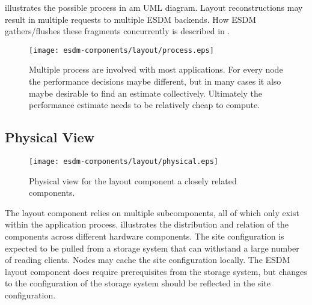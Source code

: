  illustrates the possible process in am UML diagram.
Layout reconstructions may result in multiple requests to multiple ESDM backends.
How ESDM gathers/flushes these fragments concurrently is described in .


\begin{figure}
	\centering
	\texttt{[image: esdm-components/layout/process.eps]}
	\caption{Multiple process are involved with most applications. For every node the performance decisions maybe different, but in many cases it also maybe desirable to find an estimate collectively. Ultimately the performance estimate needs to be relatively cheap to compute. }
	\label{fig:esdm layout process view}
\end{figure}





\subsection{Physical View}

\begin{figure}
	\centering
	\texttt{[image: esdm-components/layout/physical.eps]}
	\caption{Physical view for the layout component a closely related components.}
	\label{fig:esdm layout  physical view}
\end{figure}

The layout component relies on multiple subcomponents, all of which only exist within the application process.
 illustrates the distribution and relation of the components across different hardware components.
The site configuration is expected to be pulled from a storage system that can withstand a large number of reading clients.
Nodes may cache the site configuration locally.
The ESDM layout component does require prerequisites from the storage system, but changes to the configuration of the storage system should be reflected in the site configuration.


%
